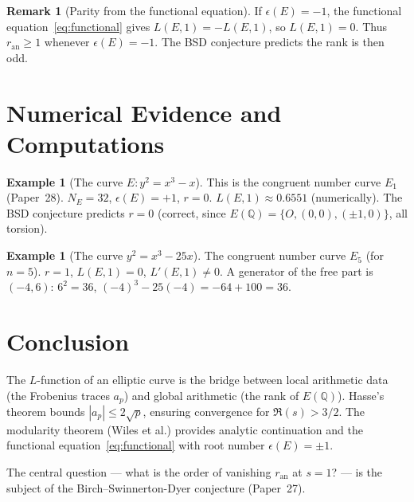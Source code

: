 \documentclass[12pt,a4paper]{amsart}
\theoremstyle{definition}
\newtheorem{remark}[theorem]{Remark}
\newtheorem{example}[theorem]{Example}
\newcommand{\Q}{\mathbb{Q}}
\begin{document}
\begin{remark}[Parity from the functional equation]
If $\epsilon(E) = -1$, the functional equation~\eqref{eq:functional} gives
$L(E,1) = -L(E,1)$, so $L(E,1) = 0$.
Thus $r_{\mathrm{an}} \ge 1$ whenever $\epsilon(E) = -1$.
The BSD conjecture predicts the rank is then odd.
\end{remark}

\section{Numerical Evidence and Computations}

\begin{example}[The curve $E: y^2 = x^3 - x$]
\label{ex:rank0}
This is the congruent number curve $E_1$ (Paper~28).
$N_E = 32$, $\epsilon(E) = +1$, $r = 0$.
$L(E,1) \approx 0.6551$ (numerically).
The BSD conjecture predicts $r = 0$ (correct, since $E(\Q) = \{O, (0,0), (\pm 1, 0)\}$,
all torsion).
\end{example}

\begin{example}[The curve $y^2 = x^3 - 25x$]
\label{ex:rank1}
The congruent number curve $E_5$ (for $n=5$).
$r = 1$, $L(E,1) = 0$, $L'(E,1) \ne 0$.
A generator of the free part is $(-4, 6)$:
$6^2 = 36$, $(-4)^3 - 25(-4) = -64 + 100 = 36$. \checkmark
\end{example}

\section{Conclusion}

The $L$-function of an elliptic curve is the bridge between local
arithmetic data (the Frobenius traces $a_p$) and global arithmetic
(the rank of $E(\Q)$).
Hasse's theorem bounds $|a_p| \le 2\sqrt{p}$, ensuring convergence for $\Re(s) > 3/2$.
The modularity theorem (Wiles et al.) provides analytic continuation
and the functional equation~\eqref{eq:functional} with root number $\epsilon(E) = \pm 1$.

The central question --- what is the order of vanishing $r_{\mathrm{an}}$
at $s = 1$? --- is the subject of the Birch--Swinnerton-Dyer conjecture (Paper~27).
\end{document}
